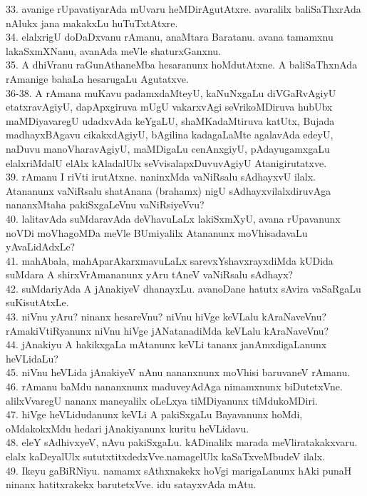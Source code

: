 \documentclass{article}
\begin{document}
33. avanige rUpavatiyarAda mUvaru heMDirAgutAtxre. avaralilx baliSaThxrAda nAlukx jana makakxLu huTuTxtAtxre.\\
34. elalxrigU doDaDxvanu rAmanu, anaMtara Baratanu. avana tamamxnu lakaSxmXNanu, avanAda meVle shaturxGanxnu.\\
35. A dhiVranu raGunAthaneMba hesaranunx hoMdutAtxne. A baliSaThxnAda rAmanige bahaLa hesarugaLu Agutatxve.\\
36-38. A rAmana muKavu padamxdaMteyU, kaNuNxgaLu diVGaRvAgiyU etatxravAgiyU, dapApxgiruva mUgU vakarxvAgi seVrikoMDiruva hubUbx maMDiyavaregU udadxvAda keYgaLU, shaMKadaMtiruva katUtx, Bujada madhayxBAgavu cikakxdAgiyU, bAgilina kadagaLaMte agalavAda edeyU, naDuvu manoVharavAgiyU, maMDigaLu cenAnxgiyU, pAdayugamxgaLu elalxriMdalU elAlx kAladalUlx seVvisalapxDuvuvAgiyU Atanigirutatxve.\\
39. rAmanu I riVti irutAtxne. naninxMda vaNiRsalu sAdhayxvU ilalx. Atananunx vaNiRsalu shatAnana (brahamx) nigU sAdhayxvilalxdiruvAga nananxMtaha pakiSxgaLeVnu vaNiRsiyeVvu?\\
40. lalitavAda suMdaravAda deVhavuLaLx lakiSxmXyU, avana rUpavanunx noVDi moVhagoMDa meVle BUmiyalilx Atananunx moVhisadavaLu yAvaLidAdxLe?\\
41. mahAbala, mahAparAkarxmavuLaLx sarevxYshavxrayxdiMda kUDida suMdara A shirxVrAmananunx yAru tAneV vaNiRsalu sAdhayx?\\
42. suMdariyAda A jAnakiyeV dhanayxLu. avanoDane hatutx sAvira vaSaRgaLu suKisutAtxLe.\\
43. niVnu yAru? ninanx hesareVnu? niVnu hiVge keVLalu kAraNaveVnu? rAmakiVtiRyanunx niVnu hiVge jANatanadiMda keVLalu kAraNaveVnu?\\
44. jAnakiyu A hakikxgaLa mAtanunx keVLi tananx janAmxdigaLanunx heVLidaLu?\\
45. niVnu heVLida jAnakiyeV nAnu nananxnunx moVhisi baruvaneV rAmanu.\\
46. rAmanu baMdu nananxnunx maduveyAdAga nimamxnunx biDutetxVne. alilxVvaregU nananx maneyalilx oLeLxya tiMDiyanunx tiMdukoMDiri.\\
47. hiVge heVLidudanunx keVLi A pakiSxgaLu Bayavanunx hoMdi, oMdakokxMdu hedari jAnakiyanunx kuritu heVLidavu.\\
48. eleY sAdhivxyeV, nAvu pakiSxgaLu. kADinalilx marada meVliratakakxvaru. elalx kaDeyalUlx sututxtitxdedxVve.namagelUlx kaSaTxveMbudeV ilalx.\\
49. Ikeyu gaBiRNiyu. namamx sAthxnakekx hoVgi marigaLanunx hAki punaH ninanx hatitxrakekx barutetxVve. idu satayxvAda mAtu.\\
\end{document}
